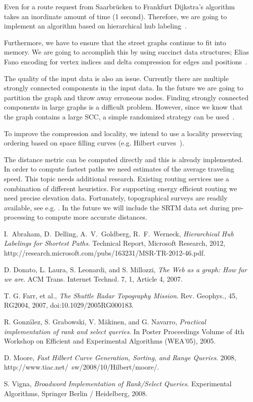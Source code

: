 \documentclass[a4paper]{article}
\begin{document}
Even for a route request from Saarbrücken to Frankfurt Dijkstra's algorithm takes an inordinate amount of time (1 second).
Therefore, we are going to implement an algorithm based on hierarchical hub labeling~\cite{abra12}.

Furthermore, we have to ensure that the street graphs continue to fit into memory.
We are going to accomplish this by using succinct data structures;
Elias Fano encoding for vertex indices and delta compression for edges and positions~\cite{gon05, vig08}.

The quality of the input data is also an issue.
Currently there are multiple strongly connected components in the input data.
In the future we are going to partition the graph and throw away erroneous nodes.
Finding strongly connected components in large graphs is a difficult problem.
However, since we know that the graph contains a large SCC,
a simple randomized strategy can be used~\cite{don07}.

To improve the compression and locality, we intend to use a locality preserving ordering based on space filling curves
(e.g. Hilbert curves~\cite{moo08}).

The distance metric can be computed directly and this is already implemented.
In order to compute fastest paths we need estimates of the average traveling speed.
This topic needs additional research.
Existing routing services use a combination of different heuristics.
For supporting energy efficient routing we need precise elevation data.
Fortunately, topographical surveys are readily available, see e.g. \cite{farr07}.
In the future we will include the SRTM data set during pre-processing to compute
more accurate distances.

\begin{thebibliography}{9}

  I.~Abraham, D.~Delling, A.~V.~Goldberg, R.~F.~Werneck,
  \emph{Hierarchical Hub Labelings for Shortest Paths}.
  Technical Report,
  Microsoft Research,
  2012,
  http://research.microsoft.com/pubs/163231/MSR-TR-2012-46.pdf.

	D. Donato, L. Laura, S. Leonardi, and S. Millozzi, \emph{The Web as a graph: How far we are}. ACM Trans. Internet Technol. 7, 1, Article 4, 2007. 

	T. G. Farr, et al., \emph{The Shuttle Radar Topography Mission}. Rev. Geophys., 45, RG2004, 2007, doi:10.1029/2005RG000183.
	
	R. González, S. Grabowski, V. Mäkinen, and G. Navarro, \emph{Practical implementation of rank and select queries}. In Poster Proceedings Volume of 4th Workshop on Efficient and Experimental Algorithms (WEA'05), 2005.
	
	D. Moore, \emph{Fast Hilbert Curve Generation, Sorting, and Range Queries}. 2008, http://www.tiac.net/~sw/2008/10/Hilbert/moore/.
	
	S. Vigna, \emph{Broadword Implementation of Rank/Select Queries}. Experimental Algorithms, Springer Berlin / Heidelberg, 2008.

\end{thebibliography}
\end{document}
